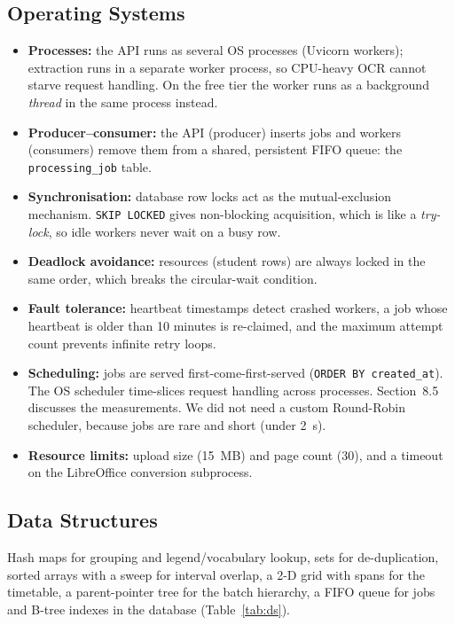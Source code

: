 \subsection{Operating Systems}
\begin{itemize}
\item \textbf{Processes:} the API runs as several OS processes (Uvicorn workers); extraction runs in a
      separate worker process, so CPU-heavy OCR cannot starve request handling. On the free tier the
      worker runs as a background \emph{thread} in the same process instead.
\item \textbf{Producer--consumer:} the API (producer) inserts jobs and workers (consumers) remove them
      from a shared, persistent FIFO queue: the \texttt{processing\_job} table.
\item \textbf{Synchronisation:} database row locks act as the mutual-exclusion mechanism.
      \texttt{SKIP LOCKED} gives non-blocking acquisition, which is like a \emph{try-lock}, so idle
      workers never wait on a busy row.
\item \textbf{Deadlock avoidance:} resources (student rows) are always locked in the same order,
      which breaks the circular-wait condition.
\item \textbf{Fault tolerance:} heartbeat timestamps detect crashed workers, a job whose heartbeat is
      older than 10 minutes is re-claimed, and the maximum attempt count prevents infinite retry loops.
\item \textbf{Scheduling:} jobs are served first-come-first-served (\texttt{ORDER BY created\_at}). The
      OS scheduler time-slices request handling across processes. Section~8.5 discusses the
      measurements. We did not need a custom Round-Robin scheduler, because jobs are rare and short (under 2~s).
\item \textbf{Resource limits:} upload size (15~MB) and page count (30), and a timeout on the
      LibreOffice conversion subprocess.
\end{itemize}

\subsection{Data Structures}
Hash maps for grouping and legend/vocabulary lookup, sets for de-duplication, sorted arrays with a
sweep for interval overlap, a 2-D grid with spans for the timetable, a parent-pointer tree for the
batch hierarchy, a FIFO queue for jobs and B-tree indexes in the database (Table~\ref{tab:ds}).

